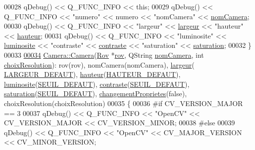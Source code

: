 \begin{DoxyCode}
00028     qDebug() << Q\_FUNC\_INFO << \textcolor{keyword}{this};
00029     qDebug() << Q\_FUNC\_INFO << \textcolor{stringliteral}{"numero"} << numero << \textcolor{stringliteral}{"nomCamera"} << \hyperlink{class_camera_ac1cdaf82921d2a2f3f941d867718eba2}{nomCamera};
00030     qDebug() << Q\_FUNC\_INFO << \textcolor{stringliteral}{"largeur"} << \hyperlink{class_camera_ad64f26cdfc5aa561208b273d430938cf}{largeur} << \textcolor{stringliteral}{"hauteur"} << 
      \hyperlink{class_camera_a5d89d7f9d1a5eab4175dd168c7fbf1c7}{hauteur};
00031     qDebug() << Q\_FUNC\_INFO << \textcolor{stringliteral}{"luminosite"} << \hyperlink{class_camera_aca5433bf19773161142d73009469b1ed}{luminosite} << \textcolor{stringliteral}{"contraste"} << 
      \hyperlink{class_camera_ad3b300e52c91341d985d3b54f562a0f7}{contraste} << \textcolor{stringliteral}{"saturation"} << \hyperlink{class_camera_afd46d6d2451ee33b68dbc74713f2687c}{saturation};
00032 \}
00033 
\hyperlink{class_camera_ae663da224161d1a78c8a7431ad1530d7}{00034} \hyperlink{class_camera_a26c49f76c98ece6ad6771351dd13583a}{Camera::Camera}(\hyperlink{class_rov}{Rov} *\hyperlink{class_camera_ad1dde4d981877001281af01c392307f1}{rov}, QString \hyperlink{class_camera_ac1cdaf82921d2a2f3f941d867718eba2}{nomCamera}, \textcolor{keywordtype}{int} 
      \hyperlink{class_camera_a3fdddf6f548f04d7bdc26f32602a03d4}{choixResolution}): rov(rov), nomCamera(nomCamera), \hyperlink{class_camera_ad64f26cdfc5aa561208b273d430938cf}{largeur}(
      \hyperlink{camera_8h_afe66edd1ec0aa05058aaa2a069248f65}{LARGEUR\_DEFAUT}), \hyperlink{class_camera_a5d89d7f9d1a5eab4175dd168c7fbf1c7}{hauteur}(\hyperlink{camera_8h_a70cf269dc21e5a921c2927034d6cadd2}{HAUTEUR\_DEFAUT}), 
      \hyperlink{class_camera_aca5433bf19773161142d73009469b1ed}{luminosite}(\hyperlink{camera_8h_ae340bfbdd3eec3bbbea7d39d91c8aa91}{SEUIL\_DEFAUT}), \hyperlink{class_camera_ad3b300e52c91341d985d3b54f562a0f7}{contraste}(\hyperlink{camera_8h_ae340bfbdd3eec3bbbea7d39d91c8aa91}{SEUIL\_DEFAUT}), 
      \hyperlink{class_camera_afd46d6d2451ee33b68dbc74713f2687c}{saturation}(\hyperlink{camera_8h_ae340bfbdd3eec3bbbea7d39d91c8aa91}{SEUIL\_DEFAUT}), \hyperlink{class_camera_a50d2b3ef5c08f8b61bbe2115d71005bd}{changementProprietes}(false), 
      choixResolution(choixResolution)
00035 \{
00036 \textcolor{preprocessor}{    #if CV\_VERSION\_MAJOR == 3}
00037     qDebug() << Q\_FUNC\_INFO << \textcolor{stringliteral}{"OpenCV"} << CV\_VERSION\_MAJOR << CV\_VERSION\_MINOR;
00038 \textcolor{preprocessor}{    #else}
00039     qDebug() << Q\_FUNC\_INFO << \textcolor{stringliteral}{"OpenCV"} << CV\_MAJOR\_VERSION << CV\_MINOR\_VERSION;

\end{DoxyCode}
